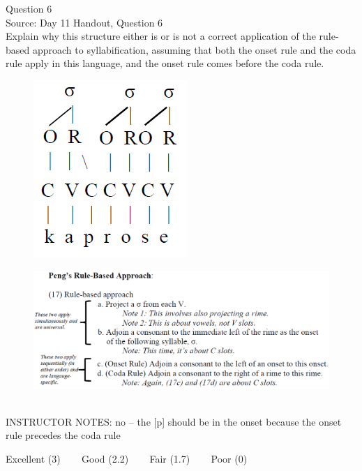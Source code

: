 \documentclass[12pt]{article}
\begin{document}
{\large Question 6}\\

Source: Day 11 Handout, Question 6\\

Explain why this structure either is or is not a correct application of the rule-based approach to syllabification, assuming that both the onset rule and the coda rule apply in this language, and the onset rule comes before the coda rule.\\

\begin{figure}[H]
\includegraphics{../images/pengrules_kaprose_no.png}
\end{figure}
\begin{figure}[H]
\includegraphics{../images/peng_rules.png}
\end{figure}

~\\
INSTRUCTOR NOTES: no -- the [p] should be in the onset because the onset rule precedes the coda rule


\vfill
Excellent (3) ~~~ Good (2.2) ~~~ Fair (1.7) ~~~ Poor (0)
\newpage

\begin{center}
\textbf{{\color{red}{\HUGE END OF EXAM}}}\\

\end{center}
\newpage
\end{document}
